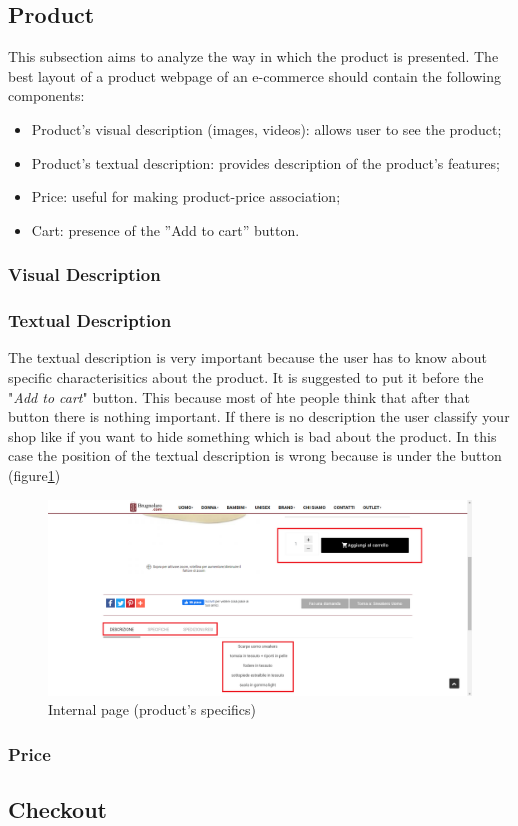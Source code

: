 \subsection{Product}
This subsection aims to analyze the way in which the product is presented.
The best layout of a product webpage of an e-commerce should contain the following components:
\begin{itemize}
    \item Product's visual description (images, videos): allows user to see the product;
    \item Product's textual description: provides description of the product's features;
    \item Price: useful for making product-price association;
    \item Cart: presence of the ”Add to cart” button.
\end{itemize}

\subsubsection{Visual Description}

\subsubsection{Textual Description}
The textual description is very important because the user has to know about specific
characterisitics about the product. It is suggested to put it before the "\textit{Add to cart}" button.
This because most of hte people think that after that button there is nothing important.
If there is no description the user classify your shop like if you want to hide something
which is bad about the product.
In this case the position of the textual description is wrong because is under the button
(figure\ref{internal-specifics})
\begin{figure}[!h] 
    \centering 
    \includegraphics[scale = 0.29]{images/product_specifics.png} 
    \caption{Internal page (product's specifics)}
    \label{internal-specifics}
\end{figure}

\subsubsection{Price}

\subsection{Checkout}